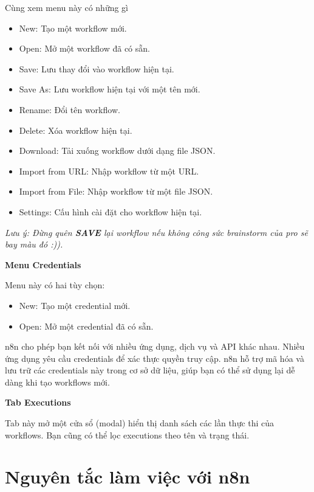 Cùng xem menu này có những gì
\begin{itemize}
    \item New: Tạo một workflow mới.

    \item Open: Mở một workflow đã có sẵn.

    \item Save: Lưu thay đổi vào workflow hiện tại.

    \item Save As: Lưu workflow hiện tại với một tên mới.

    \item Rename: Đổi tên workflow.

    \item Delete: Xóa workflow hiện tại.

    \item Download: Tải xuống workflow dưới dạng file JSON.

    \item Import from URL: Nhập workflow từ một URL.

    \item Import from File: Nhập workflow từ một file JSON.

    \item Settings: Cấu hình cài đặt cho workflow hiện tại.
\end{itemize}

\textit{Lưu ý: Đừng quên \textbf{SAVE} lại workflow nếu không công sức brainstorm của pro sẽ bay màu đó :)).}

\textbf{Menu Credentials}

Menu này có hai tùy chọn:
\begin{itemize}
    \item New: Tạo một credential mới.

    \item Open: Mở một credential đã có sẵn.
\end{itemize}

n8n cho phép bạn kết nối với nhiều ứng dụng, dịch vụ và API khác nhau. Nhiều ứng dụng yêu cầu credentials để xác thực quyền truy cập. n8n hỗ trợ mã hóa và lưu trữ các credentials này trong cơ sở dữ liệu, giúp bạn có thể sử dụng lại dễ dàng khi tạo workflows mới.

\textbf{Tab Executions}

Tab này mở một cửa sổ (modal) hiển thị danh sách các lần thực thi của workflows. Bạn cũng có thể lọc executions theo tên và trạng thái.
\section{Nguyên tắc làm việc với n8n}


